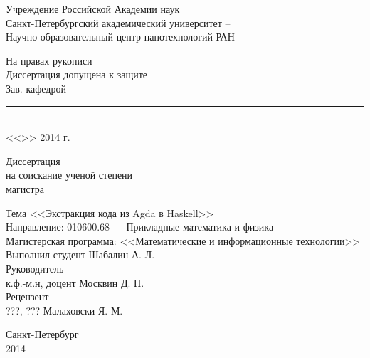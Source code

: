 \begin{titlepage}

\begin{center}
Учреждение Российской Академии наук\\
Санкт-Петербургский академический университет --\\
Научно-образовательный центр нанотехнологий РАН
\end{center}

\vspace{1cm}

\begin{flushright}
\begin{minipage}{0.4\textwidth}
\begin{center}
На правах рукописи\\[1cm]
Диссертация допущена к защите\\
Зав. кафедрой\\
\rule{5cm}{.5pt}\\
<<\hspace{.5cm}>> \underline{\hspace{3.5cm}} 2014 г.\\
\end{center}
\end{minipage}
\end{flushright}

\vspace{1cm}

\begin{center}
Диссертация\\
на соискание ученой степени\\
магистра
\end{center}

\begin{flushleft}
Тема <<Экстракция кода из Agda в Haskell>>\\[1cm]

Направление: 010600.68 --- Прикладные математика и физика\\[1cm]

Магистерская программа: <<Математические и информационные технологии>>\\[2cm]

Выполнил студент \hfill Шабалин А. Л.\\[1cm]

Руководитель\\
к.ф.-м.н, доцент \hfill Москвин Д. Н.\\[1cm]

Рецензент\\
???, ??? \hfill Малаховски Я. М.
\end{flushleft}

\vfill

\begin{center}
Санкт-Петербург\\
2014
\end{center}

\end{titlepage}
